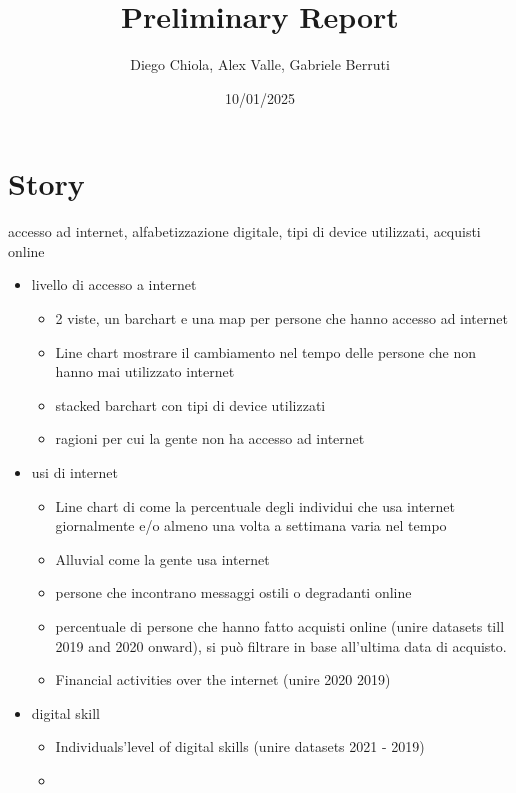 \documentclass[12pt]{article}
\title{Preliminary Report}
\author{Diego Chiola, Alex Valle, Gabriele Berruti}
\date{10/01/2025}
\begin{document}
\maketitle
\newpage

\section{Story}
accesso ad internet, alfabetizzazione digitale, tipi di device utilizzati, acquisti online
\begin{itemize}
    \item livello di accesso a internet
          \begin{itemize}
              \item 2 viste, un barchart e una map per persone che hanno accesso ad internet
              \item Line chart mostrare il cambiamento nel tempo delle persone che non hanno  mai utilizzato internet
              \item stacked barchart con tipi di device utilizzati
              \item ragioni per cui la gente non ha accesso ad internet
          \end{itemize}
    \item usi di internet
          \begin{itemize}
              \item Line chart di come la percentuale degli individui che usa internet giornalmente e/o almeno una volta a settimana varia nel tempo
              \item Alluvial come la gente usa internet
              \item persone che incontrano messaggi ostili o degradanti online
              \item percentuale di persone che hanno fatto acquisti online (unire datasets till 2019 and 2020 onward),
                    si può filtrare in base all'ultima data di acquisto.
              \item Financial activities over the internet (unire 2020 2019)
          \end{itemize}
    \item digital skill
          \begin{itemize}
              \item Individuals'level of digital skills (unire datasets 2021 - 2019)
              \item
          \end{itemize}
\end{itemize}
\end{document}
